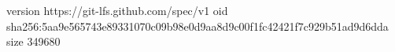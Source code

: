 version https://git-lfs.github.com/spec/v1
oid sha256:5aa9e565743e89331070c09b98e0d9aa8d9c00f1fc42421f7c929b51ad9d6dda
size 349680
